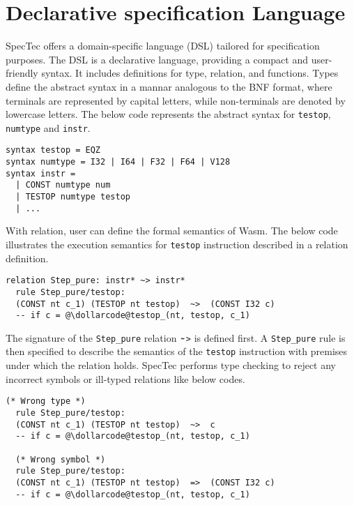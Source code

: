 
\chapter{Declarative specification Language}
\label{ch:dsl}
\noindent


SpecTec offers a domain-specific language (DSL) tailored for specification
purposes.
The DSL is a declarative language, providing a compact and user-friendly syntax.
It includes definitions for type, relation, and functions.
Types define the abstract syntax in a mannar analogous to the BNF format, where
terminals are represented by capital letters, while non-terminals are denoted
by lowercase letters.
The below code represents the abstract syntax for \texttt{testop},
\texttt{numtype} and \texttt{instr}.
\begin{lstlisting}[style=dsl]
syntax testop = EQZ
syntax numtype = I32 | I64 | F32 | F64 | V128
syntax instr =
  | CONST numtype num
  | TESTOP numtype testop
  | ...
\end{lstlisting}


With relation, user can define the formal semantics of Wasm.
The below code illustrates the execution semantics for \texttt{testop}
instruction described in a relation definition.
\begin{lstlisting}[style=dsl]
  relation Step_pure: instr* ~> instr*
  rule Step_pure/testop:
  (CONST nt c_1) (TESTOP nt testop)  ~>  (CONST I32 c)
  -- if c = @\dollarcode@testop_(nt, testop, c_1)
\end{lstlisting}
The signature of the \texttt{Step\_pure} relation $\tildecode$\texttt{>} is
defined first.
A \texttt{Step\_pure} rule is then specified to describe the semantics of the
\texttt{testop} instruction with premises under which the relation holds.
SpecTec performs type checking to reject any incorrect symbols or ill-typed
relations like below codes.
\begin{lstlisting}[style=dsl]
  (* Wrong type *)
  rule Step_pure/testop:
  (CONST nt c_1) (TESTOP nt testop)  ~>  c
  -- if c = @\dollarcode@testop_(nt, testop, c_1)

  (* Wrong symbol *)
  rule Step_pure/testop:
  (CONST nt c_1) (TESTOP nt testop)  =>  (CONST I32 c)
  -- if c = @\dollarcode@testop_(nt, testop, c_1)
\end{lstlisting}


